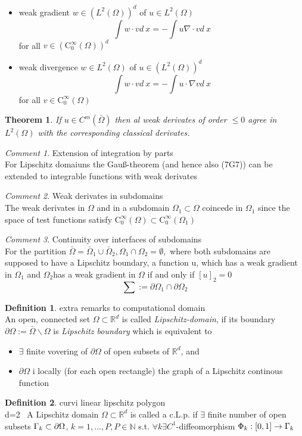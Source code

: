 \documentclass[ngerman]{article}
\newtheorem*{theorem}{Theorem}
\theoremstyle{definition}
\newtheorem*{defi}{Definition}
\theoremstyle{remark}
\newtheorem*{comm}{Comment}
\newcommand{\p}{\partial}
\newcommand{\NN}{\mathbb{N}}			%
\newcommand{\RR}{\mathbb{R}}			%
\newcommand{\OO}{\Omega}
\newcommand{\cinf}{\tx{C}^\infty}
\newcommand{\tx}[1]{\text{#1}}
\begin{document}
\begin{itemize}
\item weak gradient $w \in (L^2(\OO))^d$ of $u \in L^2(\OO)$
  $$\int w\cdot v d\ x = -\int u \nabla \cdot v d\ x$$
  for all $v \in (\cinf_0 (\OO))^d$
\item weak divergence $w\in L^2(\OO)$ of $u \in (L^2(\OO))^d$
  $$\int w\cdot v d\ x = -\int u \cdot\nabla  v d\ x$$
  for all $v \in \cinf_0(\OO)$
\end{itemize}
\begin{theorem}
  If $u \in C^m(\bar\OO)$ then al weak derivates of order $\leq 0$ agree in $L^2(\OO)$ with the corresponding classical derivates.
\end{theorem}
\begin{comm}Extension of integration by parts\\

  For Lipschitz domaiuns the Gau\ss{}-theorem (and hence also (7G7)) can be extended to integrable functions with weak derivates
\end{comm}
\begin{comm} Weak derivates in subdomains\\
  The weak derivates in $\OO$ and in a subdomain $\OO_1 \subset \OO$ coincede in $\OO_1$ since the space of test functions satisfy $\cinf_0(\OO) \subset \cinf_0(\OO_1)$
\end{comm}
\begin{comm} Continuity over interfaces of subdomains\\
  For the partition $\bar\OO = \bar\OO_1 \cup \bar\OO_2, \OO_1\cap\OO_2=\emptyset,$ where both subdomains are supposed to have a Lipschitz boundary, a function u, which has a weak gradient in $\OO_1$ and $\OO_2$has a weak gradient in $\OO$ if and only if $[u]_2 = 0$ $$\sum:= \p \OO_1 \cap\p \OO_2$$
\end{comm}
\begin{defi} extra remarks to computational domain\\
  An open, connected set $\OO \subset \RR^d $ is called \emph{Lipschitz-domain}, if its boundary $\p\OO:=\bar\OO\backslash \OO$ is \emph{Lipschitz boundary} which is equivalent to 
  \begin{itemize}
  \item $\exists$ finite vovering of $\p\OO$ of open subsets of $\RR^d$, and 
  \item $\p \OO$ i locally (for each open rectangle) the graph of a Lipschitz continous function
  \end{itemize}
\end{defi}
\begin{defi}
  curvi linear lipschitz polygon\\
  d=2 \ A Lipschitz domain $\OO\subset \RR^d$ is called a c.L.p. if $\exists $ finite number of open subsets $\GG_k \subset \p \OO$, $k=1,...,P, P\in \NN$ s.t. $\forall k \exists C^1$-diffeomorphism $\Phi_k : [0,1] \to \Gamma_k$

\end{defi}
\end{document}
